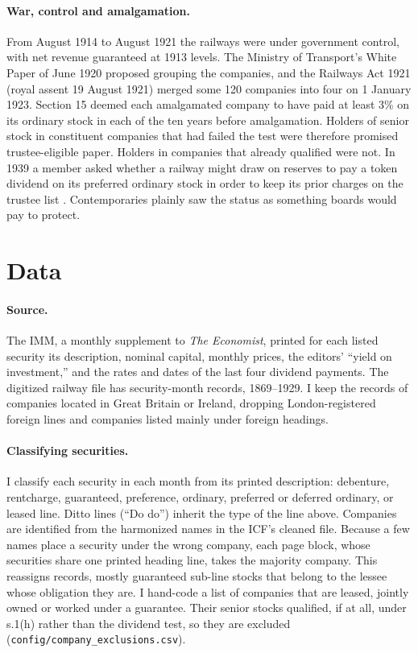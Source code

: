 \documentclass[11pt]{article}
\begin{document}
\paragraph{War, control and amalgamation.} From August 1914 to August 1921 the railways were under government control, with net revenue guaranteed at 1913 levels. The Ministry of Transport's White Paper of June 1920 \citep{Cmd787} proposed grouping the companies, and the Railways Act 1921 (royal assent 19 August 1921) merged some 120 companies into four on 1 January 1923. Section 15 deemed each amalgamated company to have paid at least 3\% on its ordinary stock in each of the ten years before amalgamation. Holders of senior stock in constituent companies that had failed the test were therefore promised trustee-eligible paper. Holders in companies that already qualified were not. In 1939 a member asked whether a railway might draw on reserves to pay a token dividend on its preferred ordinary stock in order to keep its prior charges on the trustee list \citep{Hansard1939}. Contemporaries plainly saw the status as something boards would pay to protect.

\section{Data}\label{sec:data}

\paragraph{Source.} The IMM, a monthly supplement to \textit{The Economist}, printed for each listed security its description, nominal capital, monthly prices, the editors' ``yield on investment,'' and the rates and dates of the last four dividend payments. The digitized railway file has \nRaw{} security-month records, 1869--1929. I keep the \nBritRec{} records of \nBritCos{} companies located in Great Britain or Ireland, dropping London-registered foreign lines and companies listed mainly under foreign headings.

\paragraph{Classifying securities.} I classify each security in each month from its printed description: debenture, rentcharge, guaranteed, preference, ordinary, preferred or deferred ordinary, or leased line. Ditto lines (``Do do'') inherit the type of the line above. Companies are identified from the harmonized names in the ICF's cleaned file. Because a few names place a security under the wrong company, each page block, whose securities share one printed heading line, takes the majority company. This reassigns \nReassigned{} records, mostly guaranteed sub-line stocks that belong to the lessee whose obligation they are. I hand-code a list of companies that are leased, jointly owned or worked under a guarantee. Their senior stocks qualified, if at all, under s.1(h) rather than the dividend test, so they are excluded (\texttt{config/company\_exclusions.csv}).
\end{document}
